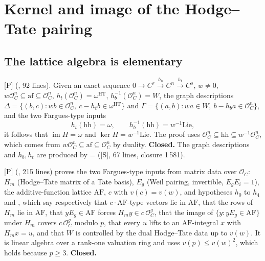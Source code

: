 \documentclass[11pt]{article}
\newcommand{\mP}{\textsf{[P]}}
\newcommand{\mS}{\textsf{[S]}}
\newcommand{\cO}{\mathcal O}
\theoremstyle{remark}
\begin{document}
\section{Kernel and image of the Hodge--Tate pairing}\label{sec:ker}

\subsection{The lattice algebra is elementary}
\mP{}  (, 92 lines). Given an exact sequence $0\to C^{r}\xrightarrow{h_b}C^{n}\xrightarrow{h_t}C^{s}$, $w\neq0$, $w\cO_C^n\subseteq\mathrm{af}\subseteq\cO_C^n$, $h_t(\cO_C^n)=\omega^{\mathrm{HT}}$, $h_b^{-1}(\cO_C^n)=W$, the graph descriptions $\Delta=\{(b,c): wb\in\cO_C^n,\ c-h_tb\in\omega^{\mathrm{HT}}\}$ and $\Gamma=\{(a,b): wa\in W,\ b-h_ba\in\cO_C^n\}$, and the two Fargues-type inputs
\[
h_t(\mathrm{hh})=\omega,\qquad h_b^{-1}(\mathrm{hh})=w^{-1}\mathrm{Lie},
\]
it follows that $\operatorname{im}H=\omega$ and $\ker H=w^{-1}\mathrm{Lie}$. The proof uses $\cO_C^n\subseteq\mathrm{hh}\subseteq w^{-1}\cO_C^n$, which comes from $w\cO_C^n\subseteq\mathrm{af}\subseteq\cO_C^n$ by duality. \textbf{Closed.} The graph descriptions and $h_b,h_t$ are produced by  =  (\mS, 67 lines, closure 1\,581).

\mP{}  (, 215 lines) proves the two Fargues-type inputs from matrix data over $\cO_C$: $H_m$ (Hodge--Tate matrix of a Tate basis), $E_g$ (Weil pairing, invertible, $E_gE_i=1$), the additive-function lattice $\mathrm{AF}$, $c$ with $v(c)=v(w)$, and hypotheses $h_0$ to $h_4$ and , which say respectively that $c\cdot\mathrm{AF}$-type vectors lie in $\mathrm{AF}$, that the rows of $H_m$ lie in $\mathrm{AF}$, that $yE_g\in\mathrm{AF}$ forces $H_my\in c\,\cO_C^g$, that the image of $\{y: yE_g\in\mathrm{AF}\}$ under $H_m$ covers $c\,\cO_C^g$ modulo $p$, that every $u$ lifts to an $\mathrm{AF}$-integral $x$ with $H_mx=u$, and that $W$ is controlled by the dual Hodge--Tate data up to $v(w)$. It is linear algebra over a rank-one valuation ring and uses $v(p)\le v(w)^2$, which holds because $p\ge3$. \textbf{Closed.}
\end{document}
